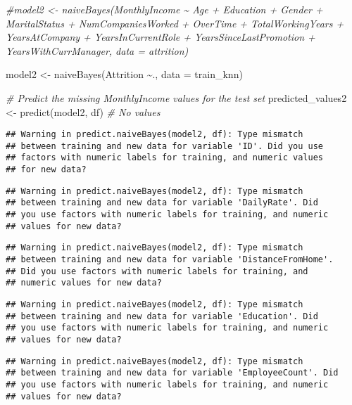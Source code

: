 \documentclass[
]{article}
\newenvironment{Shaded}{\begin{snugshade}}{\end{snugshade}}
\newcommand{\AttributeTok}[1]{\textcolor[rgb]{0.77,0.63,0.00}{#1}}
\newcommand{\CommentTok}[1]{\textcolor[rgb]{0.56,0.35,0.01}{\textit{#1}}}
\newcommand{\FunctionTok}[1]{\textcolor[rgb]{0.00,0.00,0.00}{#1}}
\newcommand{\NormalTok}[1]{#1}
\newcommand{\OtherTok}[1]{\textcolor[rgb]{0.56,0.35,0.01}{#1}}
\newcommand{\SpecialCharTok}[1]{\textcolor[rgb]{0.00,0.00,0.00}{#1}}
\begin{document}
\begin{Shaded}
\begin{Highlighting}[]
\CommentTok{\#model2 \textless{}{-} naiveBayes(MonthlyIncome \textasciitilde{} Age + Education + Gender + MaritalStatus + NumCompaniesWorked + OverTime + TotalWorkingYears + YearsAtCompany + YearsInCurrentRole +  YearsSinceLastPromotion + YearsWithCurrManager, data = attrition)}

\NormalTok{model2 }\OtherTok{\textless{}{-}} \FunctionTok{naiveBayes}\NormalTok{(Attrition }\SpecialCharTok{\textasciitilde{}}\NormalTok{.,}
                     \AttributeTok{data =}\NormalTok{ train\_knn)}

\CommentTok{\# Predict the missing MonthlyIncome values for the test set}
\NormalTok{predicted\_values2 }\OtherTok{\textless{}{-}} \FunctionTok{predict}\NormalTok{(model2, df) }\CommentTok{\# No values}
\end{Highlighting}
\end{Shaded}

\begin{verbatim}
## Warning in predict.naiveBayes(model2, df): Type mismatch
## between training and new data for variable 'ID'. Did you use
## factors with numeric labels for training, and numeric values
## for new data?
\end{verbatim}

\begin{verbatim}
## Warning in predict.naiveBayes(model2, df): Type mismatch
## between training and new data for variable 'DailyRate'. Did
## you use factors with numeric labels for training, and numeric
## values for new data?
\end{verbatim}

\begin{verbatim}
## Warning in predict.naiveBayes(model2, df): Type mismatch
## between training and new data for variable 'DistanceFromHome'.
## Did you use factors with numeric labels for training, and
## numeric values for new data?
\end{verbatim}

\begin{verbatim}
## Warning in predict.naiveBayes(model2, df): Type mismatch
## between training and new data for variable 'Education'. Did
## you use factors with numeric labels for training, and numeric
## values for new data?
\end{verbatim}

\begin{verbatim}
## Warning in predict.naiveBayes(model2, df): Type mismatch
## between training and new data for variable 'EmployeeCount'. Did
## you use factors with numeric labels for training, and numeric
## values for new data?
\end{verbatim}
\end{document}
